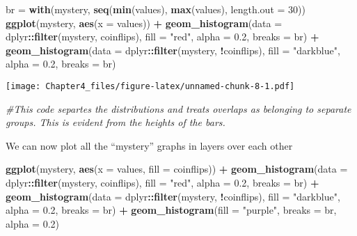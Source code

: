 \documentclass[]{article}
\newenvironment{Shaded}{\begin{snugshade}}{\end{snugshade}}
\newcommand{\CommentTok}[1]{\textcolor[rgb]{0.56,0.35,0.01}{\textit{#1}}}
\newcommand{\DataTypeTok}[1]{\textcolor[rgb]{0.13,0.29,0.53}{#1}}
\newcommand{\DecValTok}[1]{\textcolor[rgb]{0.00,0.00,0.81}{#1}}
\newcommand{\FloatTok}[1]{\textcolor[rgb]{0.00,0.00,0.81}{#1}}
\newcommand{\KeywordTok}[1]{\textcolor[rgb]{0.13,0.29,0.53}{\textbf{#1}}}
\newcommand{\NormalTok}[1]{#1}
\newcommand{\OperatorTok}[1]{\textcolor[rgb]{0.81,0.36,0.00}{\textbf{#1}}}
\newcommand{\StringTok}[1]{\textcolor[rgb]{0.31,0.60,0.02}{#1}}
\begin{document}
\begin{Shaded}
\begin{Highlighting}[]
\NormalTok{br =}\StringTok{ }\KeywordTok{with}\NormalTok{(mystery, }\KeywordTok{seq}\NormalTok{(}\KeywordTok{min}\NormalTok{(values), }\KeywordTok{max}\NormalTok{(values), }\DataTypeTok{length.out =} \DecValTok{30}\NormalTok{))}
\KeywordTok{ggplot}\NormalTok{(mystery, }\KeywordTok{aes}\NormalTok{(}\DataTypeTok{x =}\NormalTok{ values)) }\OperatorTok{+}
\StringTok{  }\KeywordTok{geom_histogram}\NormalTok{(}\DataTypeTok{data =}\NormalTok{ dplyr}\OperatorTok{::}\KeywordTok{filter}\NormalTok{(mystery, coinflips),}
     \DataTypeTok{fill =} \StringTok{"red"}\NormalTok{, }\DataTypeTok{alpha =} \FloatTok{0.2}\NormalTok{, }\DataTypeTok{breaks =}\NormalTok{ br) }\OperatorTok{+}
\StringTok{  }\KeywordTok{geom_histogram}\NormalTok{(}\DataTypeTok{data =}\NormalTok{ dplyr}\OperatorTok{::}\KeywordTok{filter}\NormalTok{(mystery, }\OperatorTok{!}\NormalTok{coinflips),}
     \DataTypeTok{fill =} \StringTok{"darkblue"}\NormalTok{, }\DataTypeTok{alpha =} \FloatTok{0.2}\NormalTok{, }\DataTypeTok{breaks =}\NormalTok{ br) }
\end{Highlighting}
\end{Shaded}

\texttt{[image: Chapter4\_files/figure-latex/unnamed-chunk-8-1.pdf]}

\begin{Shaded}
\begin{Highlighting}[]
\CommentTok{#This code separtes the distributions and treats overlaps as belonging to separate groups. This is evident from the heights of the bars.}
\end{Highlighting}
\end{Shaded}

We can now plot all the ``mystery'' graphs in layers over each other

\begin{Shaded}
\begin{Highlighting}[]
\KeywordTok{ggplot}\NormalTok{(mystery, }\KeywordTok{aes}\NormalTok{(}\DataTypeTok{x =}\NormalTok{ values, }\DataTypeTok{fill =}\NormalTok{ coinflips)) }\OperatorTok{+}
\StringTok{  }\KeywordTok{geom_histogram}\NormalTok{(}\DataTypeTok{data =}\NormalTok{ dplyr}\OperatorTok{::}\KeywordTok{filter}\NormalTok{(mystery, coinflips),}
     \DataTypeTok{fill =} \StringTok{"red"}\NormalTok{, }\DataTypeTok{alpha =} \FloatTok{0.2}\NormalTok{, }\DataTypeTok{breaks =}\NormalTok{ br) }\OperatorTok{+}
\StringTok{  }\KeywordTok{geom_histogram}\NormalTok{(}\DataTypeTok{data =}\NormalTok{ dplyr}\OperatorTok{::}\KeywordTok{filter}\NormalTok{(mystery, }\OperatorTok{!}\NormalTok{coinflips),}
     \DataTypeTok{fill =} \StringTok{"darkblue"}\NormalTok{, }\DataTypeTok{alpha =} \FloatTok{0.2}\NormalTok{, }\DataTypeTok{breaks =}\NormalTok{ br) }\OperatorTok{+}
\StringTok{  }\KeywordTok{geom_histogram}\NormalTok{(}\DataTypeTok{fill =} \StringTok{"purple"}\NormalTok{, }\DataTypeTok{breaks =}\NormalTok{ br, }\DataTypeTok{alpha =} \FloatTok{0.2}\NormalTok{)}
\end{Highlighting}
\end{Shaded}
\end{document}
